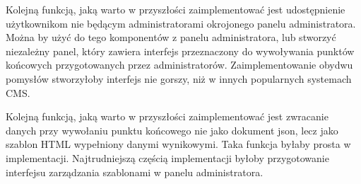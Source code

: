 Kolejną funkcją, jaką warto w przyszłości zaimplementować jest udostępnienie
użytkownikom nie będącym administratorami okrojonego panelu administratora.
Można by użyć do tego komponentów z panelu administratora, lub stworzyć
niezależny panel, który zawiera interfejs przeznaczony do wywoływania punktów
końcowych przygotowanych przez administratorów. Zaimplementowanie obydwu
pomysłów stworzyłoby interfejs nie gorszy, niż w innych popularnych systemach
CMS.

Kolejną funkcją, jaką warto w przyszłości zaimplementować jest zwracanie danych
przy wywołaniu punktu końcowego nie jako dokument json, lecz jako szablon HTML
wypełniony danymi wynikowymi. Taka funkcja byłaby prosta w implementacji.
Najtrudniejszą częścią implementacji byłoby przygotowanie interfejsu zarządzania
szablonami w panelu administratora.
